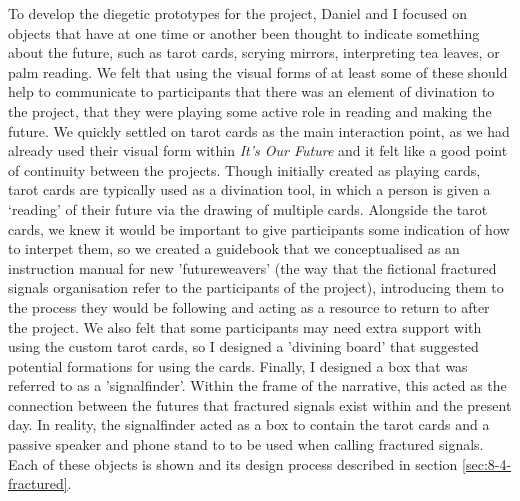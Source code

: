 To develop the diegetic prototypes for the project, Daniel and I focused on objects that have at one time or another been thought to indicate something about the future, such as tarot cards, scrying mirrors, interpreting tea leaves, or palm reading. We felt that using the visual forms of at least some of these should help to communicate to participants that there was an element of divination to the project, that they were playing some active role in reading and making the future. We quickly settled on tarot cards as the main interaction point, as we had already used their visual form within \emph{It's Our Future} and it felt like a good point of continuity between the projects. Though initially created as playing cards, tarot cards are typically used as a divination tool, in which a person is given a `reading' of their future via the drawing of multiple cards. Alongside the tarot cards, we knew it would be important to give participants some indication of how to interpet them, so we created a guidebook that we conceptualised as an instruction manual for new 'futureweavers' (the way that the fictional fractured signals organisation refer to the participants of the project), introducing them to the process they would be following and acting as a resource to return to after the project. We also felt that some participants may need extra support with using the custom tarot cards, so I designed a 'divining board' that suggested potential formations for using the cards. Finally, I designed a box that was referred to as a 'signalfinder'. Within the frame of the narrative, this acted as the connection between the futures that fractured signals exist within and the present day. In reality, the signalfinder acted as a box to contain the tarot cards and a passive speaker and phone stand to to be used when calling fractured signals. Each of these objects is shown and its design process described  in section \ref{sec:8-4-fractured}.

